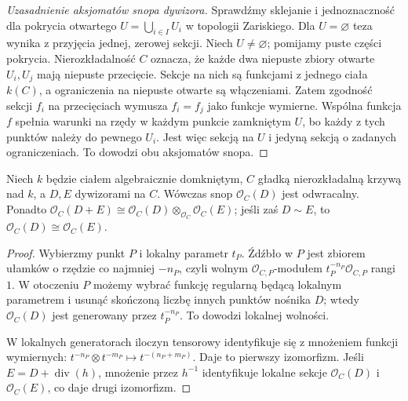 \begin{proof}[Uzasadnienie aksjomatów snopa dywizora]
Sprawdźmy sklejanie i jednoznaczność dla pokrycia
otwartego $U=\bigcup_{i\in I}U_i$ w topologii Zariskiego.
Dla $U=\varnothing$ teza wynika z przyjęcia jednej,
zerowej sekcji. Niech $U\ne\varnothing$; pomijamy
puste części pokrycia. Nierozkładalność $C$ oznacza,
że każde dwa niepuste zbiory otwarte $U_i,U_j$
mają niepuste przecięcie. Sekcje na nich są
funkcjami z jednego ciała $k(C)$, a ograniczenia
na niepuste otwarte są włączeniami. Zatem zgodność
sekcji $f_i$ na przecięciach wymusza
$f_i=f_j$ jako funkcje wymierne. Wspólna funkcja
$f$ spełnia warunki na rzędy w każdym punkcie
zamkniętym $U$, bo każdy z tych punktów należy
do pewnego $U_i$. Jest więc sekcją na $U$
i jedyną sekcją o zadanych ograniczeniach.
To dowodzi obu aksjomatów snopa.
\end{proof}

\begin{twierdzenie}
\label{tw:O-D-invertible}
Niech $k$ będzie ciałem algebraicznie domkniętym,
$C$ gładką nierozkładalną krzywą nad $k$,
a $D,E$ dywizorami na $C$.
Wówczas snop $\mathcal O_C(D)$ jest odwracalny.
Ponadto $\mathcal O_C(D+E)\cong
\mathcal O_C(D)\otimes_{\mathcal O_C}\mathcal O_C(E)$;
jeśli zaś $D\sim E$, to
$\mathcal O_C(D)\cong\mathcal O_C(E)$.
\end{twierdzenie}
\begin{proof}
Wybierzmy punkt $P$ i lokalny parametr $t_P$.
Źdźbło w $P$ jest zbiorem ułamków o rzędzie
co najmniej $-n_P$, czyli wolnym
$\mathcal O_{C,P}$-modułem $t_P^{-n_P}\mathcal O_{C,P}$
rangi $1$. W otoczeniu $P$ możemy wybrać
funkcję regularną będącą lokalnym parametrem
i usunąć skończoną liczbę innych punktów nośnika
$D$; wtedy $\mathcal O_C(D)$ jest generowany
przez $t_P^{-n_P}$. To dowodzi lokalnej wolności.

W lokalnych generatorach iloczyn tensorowy
identyfikuje się z mnożeniem funkcji wymiernych:
$t^{-n_P}\otimes t^{-m_P}\mapsto t^{-(n_P+m_P)}$.
Daje to pierwszy izomorfizm. Jeśli
$E=D+\operatorname{div}(h)$, mnożenie przez
$h^{-1}$ identyfikuje lokalne sekcje
$\mathcal O_C(D)$ i $\mathcal O_C(E)$,
co daje drugi izomorfizm.
\end{proof}



